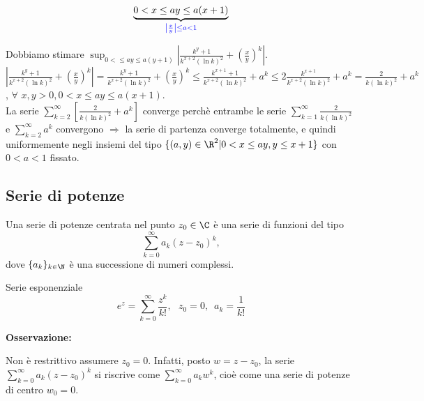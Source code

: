 \begin{exbar}
\begin{example}
	$$\underbrace{0 <x \leq a y \leq a(x+1)}_{\color{blue} \left| \frac{x}{y} \right| \leq a < 1}$$
	
	\segnaposto
	

	Dobbiamo stimare $\sup_{0 < \leq ay \leq a(y+1)}| \frac{k^y+1}{k^{x+2}(\ln k)^2} +\left(\frac{x}{y}\right)^k|$.\\
	$| \frac{k^y+1}{k^{x+2}(\ln k)^2} +\left(\frac{x}{y}\right)^k|= \frac{k^y+1}{k^{x+2}(\ln k)^2} +\left(\frac{x}{y}\right)^k \leq  \frac{k^{x+1}+1}{k^{x+2}(\ln k)^2}+a^k\leq 2\frac{k^{x+1}}{k^{x+2}(\ln k)^2}+a^k =\frac{2}{k(\ln k)^2}+a^k$, $\forall \,\, x,y >0, 0 < x \leq ay\leq a(x+1)$.\\
	La serie $\sum_{k=2}^{\infty}\left[\frac{2}{k(\ln k)^2}+a^k\right]$ converge perchè entrambe le serie $\sum_{k=1}^{\infty}\frac{2}{k(\ln k)^2}$ e $\sum_{k=2}^{\infty}a^k$ convergono $\Rightarrow$ la serie di partenza converge totalmente, e quindi uniformemente negli insiemi del tipo $\{(a,y)\in \R^2|0<x\leq ay, y \leq x+1\}$ con $0 < a<1$ fissato.
\end{example}
\end{exbar}


\subsection{Serie di potenze}

\begin{definition}
	Una serie di potenze centrata nel punto $z_0 \in \C$ è una serie di funzioni del tipo 
	\begin{equation*}
		\sum_{k=0}^{\infty} a_k(z-z_0)^k,
	\end{equation*}
	dove $\{a_k\}_{k\in\N}$ è una successione di numeri complessi.
\end{definition}


\begin{exbar}
	Serie esponenziale
	\begin{equation*}
		e^z=\sum_{k=0}^{\infty}\frac{z^k}{k!},\,\,\,\, z_0=0,\,\,\, a_k=\frac{1}{k!}
	\end{equation*}
\end{exbar}


\begin{attbar}
	\textbf{Osservazione:}
	
	Non è restrittivo assumere $z_0=0$. Infatti, posto $w=z-z_0$, la serie $\sum_{k=0}^{\infty} a_k(z-z_0)^k$ si riscrive come $\sum_{k=0}^{\infty} a_k w^k$, cioè come una serie di potenze di centro $w_0=0$.
\end{attbar}


